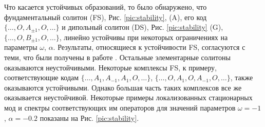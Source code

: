 Что касается устойчивых образований, то было обнаружено, что фундаментальный солитон (FS), Рис. \ref{pic:stability}, (A), его код $\{ \dots, O, A_{\pm 1}, O, \dots \}$ и дипольный солитон (DS), Рис. \ref{pic:stability} (G), $\{ \dots, O, B_{\pm 1}, O, \dots \}$, линейно устойчивы при некоторых ограничениях на параметры $\omega$, $\alpha$.
Результаты, относящиеся к устойчивости FS, согласуются с теми, что были получены в работе \cite{Malomed}.
Остальные элементарные солитоны оказываются неустойчивыми.
Некоторые комплексы FS, к примеру, соответствующие кодам $\{ \dots, A_1, A_{-1}, A_1, O, \dots \}$, $\{ \dots, O, A_1, O, A_{-1}, O, \dots \}$, также оказываются устойчивыми.
Однако большая часть таких комплексов все же оказывается неустойчивой.
Некоторые примеры локализованных стационарных мод и спектры соответствующих им операторов для значений параметров $\omega = -1$, $\alpha = -0.2$ показаны на Рис. \ref{pic:stability}.
%
